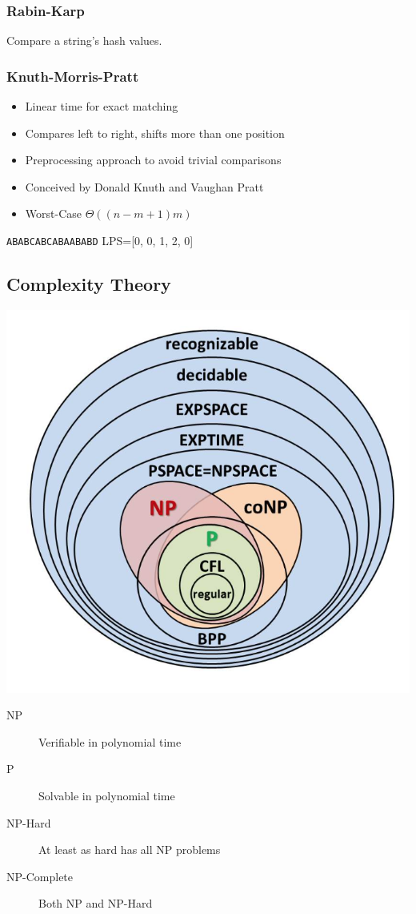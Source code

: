 \documentclass{article}
\begin{document}
\begin{multicols*}{2}
    \subsubsection*{Rabin-Karp}
    Compare a string's hash values.
    \subsubsection*{Knuth-Morris-Pratt}
    \begin{itemize}
        \item Linear time for exact matching
        \item Compares left to right, shifts more than one position
        \item Preprocessing approach to avoid trivial comparisons
        \item Conceived by Donald Knuth and Vaughan Pratt
        \item Worst-Case \(\Theta((n - m + 1) m)\)
    \end{itemize}
    \texttt{ABABCABCABAABABD}
    LPS=[0, 0, 1, 2, 0]


    \subsection*{Complexity Theory}
    \setlength{\columnsep}{0em}
    \begin{multicols*}{2}
        \includegraphics[width=\columnwidth]{complexity.png}
        \columnbreak
        \begin{description}
            \item[NP] Verifiable in polynomial time
            \item[P] Solvable in polynomial time
            \item[NP-Hard] At least as hard has all NP problems
            \item[NP-Complete] Both NP and NP-Hard
        \end{description}
    \end{multicols*}
\end{multicols*}
\end{document}
